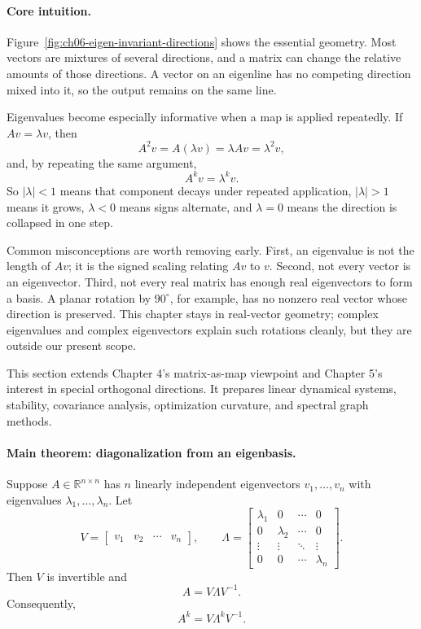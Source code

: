 \paragraph{Core intuition.}
Figure~\ref{fig:ch06-eigen-invariant-directions} shows the essential geometry. Most vectors are mixtures of several directions, and a matrix can change the relative amounts of those directions. A vector on an eigenline has no competing direction mixed into it, so the output remains on the same line.

Eigenvalues become especially informative when a map is applied repeatedly. If \(Av=\lambda v\), then
\[
A^2v=A(\lambda v)=\lambda Av=\lambda^2v,
\]
and, by repeating the same argument,
\[
A^kv=\lambda^k v.
\]
So \(|\lambda|<1\) means that component decays under repeated application, \(|\lambda|>1\) means it grows, \(\lambda<0\) means signs alternate, and \(\lambda=0\) means the direction is collapsed in one step.

Common misconceptions are worth removing early. First, an eigenvalue is not the length of \(Av\); it is the signed scaling relating \(Av\) to \(v\). Second, not every vector is an eigenvector. Third, not every real matrix has enough real eigenvectors to form a basis. A planar rotation by \(90^\circ\), for example, has no nonzero real vector whose direction is preserved. This chapter stays in real-vector geometry; complex eigenvalues and complex eigenvectors explain such rotations cleanly, but they are outside our present scope.

This section extends Chapter 4's matrix-as-map viewpoint and Chapter 5's interest in special orthogonal directions. It prepares linear dynamical systems, stability, covariance analysis, optimization curvature, and spectral graph methods.

\paragraph{Main theorem: diagonalization from an eigenbasis.}
Suppose \(A\in\mathbb{R}^{n\times n}\) has \(n\) linearly independent eigenvectors \(v_1,\dots,v_n\) with eigenvalues \(\lambda_1,\dots,\lambda_n\). Let
\[
V=
\begin{bmatrix}
v_1&v_2&\cdots&v_n
\end{bmatrix},
\qquad
\Lambda=
\begin{bmatrix}
\lambda_1&0&\cdots&0\\
0&\lambda_2&\cdots&0\\
\vdots&\vdots&\ddots&\vdots\\
0&0&\cdots&\lambda_n
\end{bmatrix}.
\]
Then \(V\) is invertible and
\[
A=V\Lambda V^{-1}.
\]
Consequently,
\[
A^k=V\Lambda^kV^{-1}.
\]

